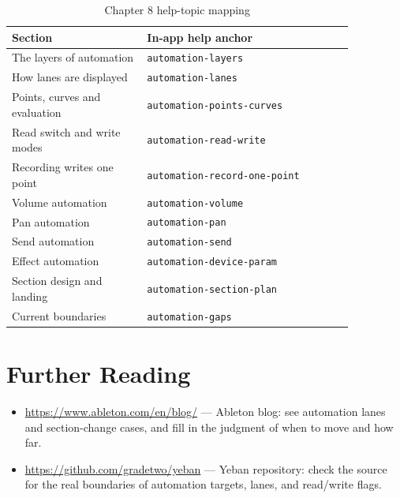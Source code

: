\begin{table}[htbp]
\centering
\small
\begin{tabular}{@{}p{0.34\linewidth}p{0.52\linewidth}@{}}
\hline
Section & In-app help anchor \\
\hline
The layers of automation & \texttt{automation-layers} \\
How lanes are displayed & \texttt{automation-lanes} \\
Points, curves and evaluation & \texttt{automation-points-curves} \\
Read switch and write modes & \texttt{automation-read-write} \\
Recording writes one point & \texttt{automation-record-one-point} \\
Volume automation & \texttt{automation-volume} \\
Pan automation & \texttt{automation-pan} \\
Send automation & \texttt{automation-send} \\
Effect automation & \texttt{automation-device-param} \\
Section design and landing & \texttt{automation-section-plan} \\
Current boundaries & \texttt{automation-gaps} \\
\hline
\end{tabular}
\caption{Chapter 8 help-topic mapping}
\label{tab:automation-help-map}
\end{table}

\section*{Further Reading}
\begin{itemize}[leftmargin=1.5em]
\item \url{https://www.ableton.com/en/blog/} — Ableton blog: see automation lanes and section-change cases, and fill in the judgment of when to move and how far.
\item \url{https://github.com/gradetwo/yeban} — Yeban repository: check the source for the real boundaries of automation targets, lanes, and read/write flags.
\end{itemize}

